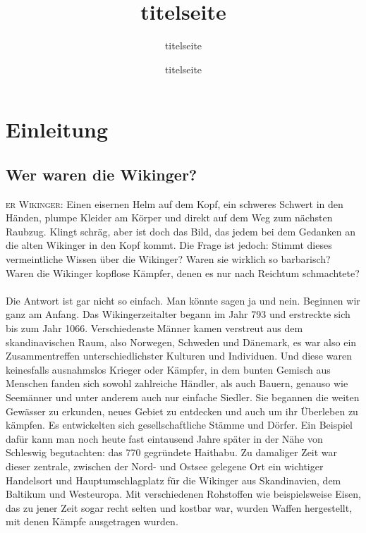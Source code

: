 \documentclass[twoside,12pt,a4paper,ngerman,openany]{book}
\newcommand{\flettrine}[2]{\lettrine[lines=2, depth=0, loversize=0.25, nindent=0.69pt, lraise=0.15]{\initfamily{#1}}{#2}}
\newcommand*\initfamily{\usefont{U}{GotIn}{xl}{n}}
\newcommand{\fchapter}[1]{\chapter{#1}\thispagestyle{chapterstyle}}
\begin{document}
\author{titelseite}
\date{titelseite}
\title{titelseite}

\maketitle
\thispagestyle{empty}
\tableofcontents
\thispagestyle{empty}
\newpage
\thispagestyle{empty}


\fchapter{Einleitung}

\section{Wer waren die Wikinger?}

\flettrine{D}{er Wikinger:} Einen eisernen Helm auf dem Kopf, ein schweres Schwert in den Händen, plumpe Kleider am Körper und direkt auf dem Weg zum nächsten Raubzug.
Klingt schräg, aber ist doch das Bild, das jedem bei dem Gedanken an die alten Wikinger in den Kopf kommt. Die Frage ist jedoch: Stimmt dieses vermeintliche Wissen über die Wikinger?
Waren sie wirklich so barbarisch? Waren die Wikinger kopflose Kämpfer, denen es nur nach Reichtum schmachtete?\\\\
Die Antwort ist gar nicht so einfach. Man könnte sagen ja und nein. Beginnen wir ganz am Anfang. Das Wikingerzeitalter begann im Jahr 793 und erstreckte sich bis zum Jahr 1066.
Verschiedenste Männer kamen verstreut aus dem skandinavischen Raum, also Norwegen, Schweden und Dänemark, es war also ein Zusammentreffen unterschiedlichster Kulturen und Individuen.
Und diese waren keinesfalls ausnahmslos Krieger oder Kämpfer, in dem bunten Gemisch aus Menschen fanden sich sowohl zahlreiche Händler, als auch Bauern, genauso wie Seemänner und unter anderem auch nur einfache Siedler.
Sie begannen die weiten Gewässer zu erkunden, neues Gebiet zu entdecken und auch um ihr Überleben zu kämpfen. Es entwickelten sich gesellschaftliche Stämme und Dörfer.
Ein Beispiel dafür kann man noch heute fast eintausend Jahre später in der Nähe von Schleswig begutachten: das 770 gegründete Haithabu. Zu damaliger Zeit war dieser zentrale,
zwischen der Nord- und Ostsee gelegene Ort ein wichtiger Handelsort und Hauptumschlagplatz für die Wikinger aus Skandinavien, dem Baltikum und Westeuropa. Mit verschiedenen Rohstoffen wie beispielsweise Eisen,
das zu jener Zeit sogar recht selten und kostbar war, wurden Waffen hergestellt, mit denen Kämpfe ausgetragen wurden.\\
\end{document}
